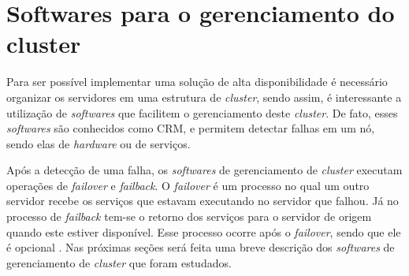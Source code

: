 

\section{Softwares para o gerenciamento do cluster}
\label{section:toolcluster}

Para ser possível implementar uma solução de alta disponibilidade é necessário organizar os servidores em uma estrutura de \textit{cluster},
sendo assim, é interessante a utilização de \textit{softwares} que facilitem o gerenciamento deste \textit{cluster}. De fato, esses 
\textit{softwares} são conhecidos como \ac{CRM}, e permitem detectar falhas em um nó, sendo elas de \textit{hardware} ou de serviços. 

Após a detecção de uma falha, os \textit{softwares} de gerenciamento de \textit{cluster} executam operações de \textit{failover} e 
\textit{failback}. O \textit{failover} é um processo no qual um outro servidor recebe os serviços que estavam executando no servidor que falhou. 
Já no processo de \textit{failback} tem-se o retorno dos serviços para o servidor de origem quando este estiver disponível. Esse processo ocorre 
após o \textit{failover}, sendo que ele é opcional \cite{bassan2008}. Nas próximas seções será feita uma breve descrição dos \textit{softwares} de 
gerenciamento de \textit{cluster} que foram estudados.


